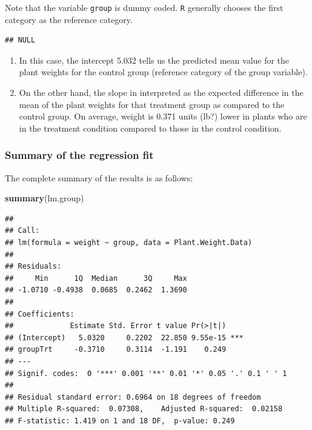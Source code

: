 \documentclass[
]{book}
\newenvironment{Shaded}{\begin{snugshade}}{\end{snugshade}}
\newcommand{\KeywordTok}[1]{\textcolor[rgb]{0.13,0.29,0.53}{\textbf{#1}}}
\newcommand{\NormalTok}[1]{#1}
\newcommand{\OperatorTok}[1]{\textcolor[rgb]{0.81,0.36,0.00}{\textbf{#1}}}
\providecommand{\tightlist}{%
  \setlength{\itemsep}{0pt}\setlength{\parskip}{0pt}}
\begin{document}
Note that the variable \texttt{group} is dummy coded. \texttt{R} generally chooses the first category as the reference category.

\begin{Shaded}
\end{Shaded}

\begin{verbatim}
## NULL
\end{verbatim}

\begin{enumerate}
\def\labelenumi{\arabic{enumi}.}
\tightlist
\item
  In this case, the intercept 5.032 tells us the predicted mean value for the plant weights for the control group (reference category of the group variable).
\item
  On the other hand, the slope in interpreted as the expected difference in the mean of the plant weights for that treatment group as compared to the control group. On average, weight is 0.371 units (lb?) lower in plants who are in the treatment condition compared to those in the control condition.
\end{enumerate}

\hypertarget{summary-of-the-regression-fit}{%
\subsubsection{Summary of the regression fit}\label{summary-of-the-regression-fit}}

The complete summary of the results is as follows:

\begin{Shaded}
\begin{Highlighting}[]
\KeywordTok{summary}\NormalTok{(lm.group)}
\end{Highlighting}
\end{Shaded}

\begin{verbatim}
## 
## Call:
## lm(formula = weight ~ group, data = Plant.Weight.Data)
## 
## Residuals:
##     Min      1Q  Median      3Q     Max 
## -1.0710 -0.4938  0.0685  0.2462  1.3690 
## 
## Coefficients:
##             Estimate Std. Error t value Pr(>|t|)    
## (Intercept)   5.0320     0.2202  22.850 9.55e-15 ***
## groupTrt     -0.3710     0.3114  -1.191    0.249    
## ---
## Signif. codes:  0 '***' 0.001 '**' 0.01 '*' 0.05 '.' 0.1 ' ' 1
## 
## Residual standard error: 0.6964 on 18 degrees of freedom
## Multiple R-squared:  0.07308,	Adjusted R-squared:  0.02158 
## F-statistic: 1.419 on 1 and 18 DF,  p-value: 0.249
\end{verbatim}
\end{document}
